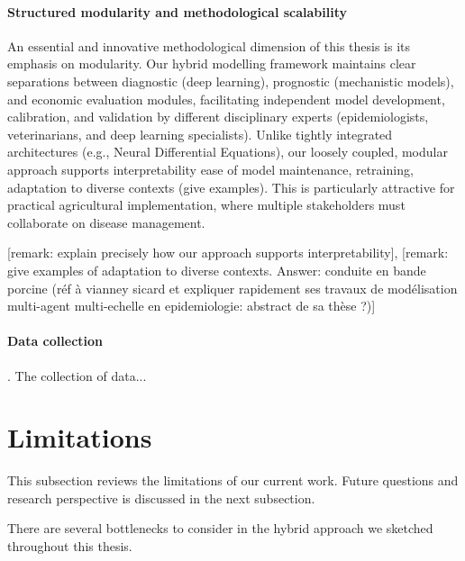 \paragraph{Structured modularity and methodological scalability} An essential and innovative methodological dimension of this thesis is its emphasis on modularity. Our hybrid modelling framework maintains clear separations between diagnostic (deep learning), prognostic (mechanistic models), and economic evaluation modules, facilitating independent model development, calibration, and validation by different disciplinary experts (epidemiologists, veterinarians, and deep learning specialists). Unlike tightly integrated architectures (e.g., Neural Differential Equations), our loosely coupled, modular approach supports interpretability  ease of model maintenance, retraining, adaptation to diverse contexts (give examples). This is particularly attractive for practical agricultural implementation, where multiple stakeholders must collaborate on disease management.

[remark: explain precisely how our approach supports interpretability],
[remark: give examples of adaptation to diverse contexts. Answer: conduite en bande porcine (réf à vianney sicard et expliquer rapidement ses travaux de modélisation multi-agent multi-echelle en epidemiologie: abstract de sa thèse ?)]


\paragraph{Data collection}. The collection of data... 




\section{Limitations}
This subsection reviews the limitations of our current work. Future questions and research perspective is discussed in the next subsection.

There are several bottlenecks to consider in the hybrid approach we sketched throughout this thesis.

